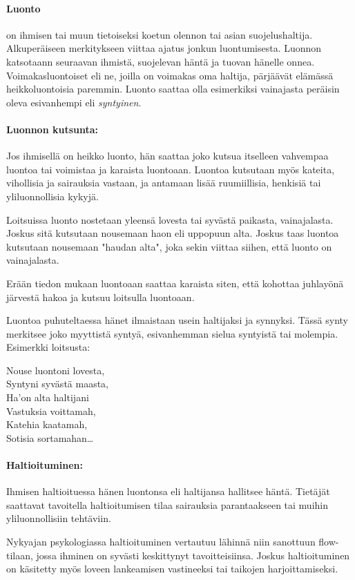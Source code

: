   \paragraph{Luonto} on ihmisen tai muun tietoiseksi koetun olennon tai asian suojelushaltija.
    Alkuperäiseen merkitykseen viittaa ajatus jonkun luontumisesta. Luonnon katsotaann
    seuraavan ihmistä, suojelevan häntä ja tuovan hänelle onnea. Voimakasluontoiset eli ne,
    joilla on voimakas oma haltija, pärjäävät elämässä heikkoluontoisia paremmin. Luonto
    saattaa olla esimerkiksi vainajasta peräisin oleva esivanhempi eli \emph{syntyinen}.
  \paragraph{Luonnon kutsunta:} Jos ihmisellä on heikko luonto, hän saattaa joko kutsua itselleen
    vahvempaa luontoa tai voimistaa ja karaista luontoaan. Luontoa kutsutaan myös kateita,
    vihollisia ja sairauksia vastaan, ja antamaan lisää ruumiillisia, henkisiä tai yliluonnollisia
    kykyjä. \par
    Loitsuissa luonto nostetaan yleensä lovesta tai syvästä paikasta, vainajalasta. Joskus sitä
    kutsutaan nousemaan haon eli uppopuun alta. Joskus taas luontoa kutsutaan nousemaan "haudan
    alta", joka sekin viittaa siihen, että luonto on vainajalasta. \par
    Erään tiedon mukaan luontoaan saattaa karaista siten, että kohottaa juhlayönä järvestä hakoa
    ja kutsuu loitsulla luontoaan. \par
    Luontoa puhuteltaessa hänet ilmaistaan usein haltijaksi ja synnyksi. Tässä synty merkitsee
    joko myyttistä syntyä, esivanhemman sielua syntyistä tai molempia. Esimerkki loitsusta:

    \begin{center}\begin{em}
      Nouse luontoni lovesta,\\
      Syntyni syvästä maasta,\\
      Ha'on alta haltijani\\
      Vastuksia voittamah,\\
      Katehia kaatamah,\\
      Sotisia sortamahan\ldots\\
    \end{em}\end{center}

  \paragraph{Haltioituminen:} Ihmisen haltioituessa hänen luontonsa eli haltijansa hallitsee
    häntä. Tietäjät saattavat tavoitella haltioitumisen tilaa sairauksia parantaakseen tai
    muihin yliluonnollisiin tehtäviin. \par
    Nykyajan psykologiassa haltioituminen vertautuu lähinnä niin sanottuun flow-tilaan, jossa
    ihminen on syvästi keskittynyt tavoitteisiinsa. Joskus haltioituminen on käsitetty myös
    loveen lankeamisen vastineeksi tai taikojen harjoittamiseksi.
